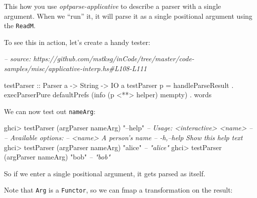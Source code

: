 \documentclass[]{article}
\newenvironment{Shaded}{}{}
\newcommand{\CommentTok}[1]{\textcolor[rgb]{0.38,0.63,0.69}{\textit{#1}}}
\newcommand{\DataTypeTok}[1]{\textcolor[rgb]{0.56,0.13,0.00}{#1}}
\newcommand{\FunctionTok}[1]{\textcolor[rgb]{0.02,0.16,0.49}{#1}}
\newcommand{\NormalTok}[1]{#1}
\newcommand{\OtherTok}[1]{\textcolor[rgb]{0.00,0.44,0.13}{#1}}
\newcommand{\StringTok}[1]{\textcolor[rgb]{0.25,0.44,0.63}{#1}}
\begin{document}
This how you use \emph{optparse-applicative} to describe a parser with a single
argument. When we ``run'' it, it will parse it as a single positional argument
using the \texttt{ReadM}.

To see this in action, let's create a handy tester:

\begin{Shaded}
\begin{Highlighting}[]
\CommentTok{-- source: https://github.com/mstksg/inCode/tree/master/code-samples/misc/applicative-interp.hs#L108-L111}

\OtherTok{testParser ::} \DataTypeTok{Parser}\NormalTok{ a }\OtherTok{->} \DataTypeTok{String} \OtherTok{->} \DataTypeTok{IO}\NormalTok{ a}
\NormalTok{testParser p }\FunctionTok{=}\NormalTok{ handleParseResult}
             \FunctionTok{.}\NormalTok{ execParserPure defaultPrefs (info (p }\FunctionTok{<**>}\NormalTok{ helper) }\FunctionTok{mempty}\NormalTok{)}
             \FunctionTok{.} \FunctionTok{words}
\end{Highlighting}
\end{Shaded}

We can now test out \texttt{nameArg}:

\begin{Shaded}
\begin{Highlighting}[]
\NormalTok{ghci}\FunctionTok{>}\NormalTok{ testParser (argParser nameArg) }\StringTok{"--help"}
\CommentTok{-- Usage: <interactive> <name>}
\CommentTok{--}
\CommentTok{-- Available options:}
\CommentTok{--   <name>                   A person's name}
\CommentTok{--   -h,--help                Show this help text}
\NormalTok{ghci}\FunctionTok{>}\NormalTok{ testParser (argParser nameArg) }\StringTok{"alice"}
\CommentTok{-- "alice"}
\NormalTok{ghci}\FunctionTok{>}\NormalTok{ testParser (argParser nameArg) }\StringTok{"bob"}
\CommentTok{-- "bob"}
\end{Highlighting}
\end{Shaded}

So if we enter a single positional argument, it gets parsed as itself.

Note that \texttt{Arg} is a \texttt{Functor}, so we can fmap a transformation on
the result:

\begin{Shaded}
\end{Shaded}
\end{document}
